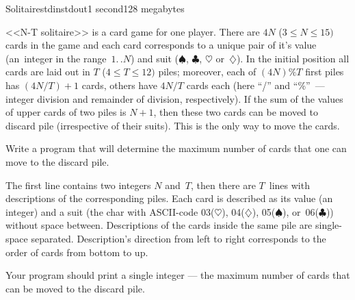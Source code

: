 \begin{problem}{Solitaire}{stdin}{stdout}{1 second}{128 megabytes}

<<N-T solitaire>> is a card game for one player. There are $4N$ 
($3\leq N\leq 15)$ cards in the game and each card corresponds to a unique pair of it's value (an~integer in the range~$1.\,.N$) and suit ($\spadesuit$, $\clubsuit$, $\heartsuit$ or~$\diamondsuit$). In the initial position all cards are laid out in $T$ ($4\leq T\leq 12)$ piles; moreover, each of $(4N)\%T$ first piles has $(4N/T)+1$ cards, others have $4N/T$ cards each (here ``/'' and ``\%''~--- integer division and remainder of division, respectively). If the sum of the values of upper cards of two piles is $N+1$, then these two cards can be moved to discard pile (irrespective of their suits). This is the only way to move the cards.

Write a program that will determine the maximum number of cards that one can move to the discard pile.

\InputFile
The first line contains two integers $N$ and~$T$, then there are $T$~lines with descriptions of the corresponding piles. Each card is described as its value (an integer) and a suit (the char with ASCII-code 03($\heartsuit$), 04($\diamondsuit$), 05($\spadesuit$), or~06($\clubsuit$)) without space between. Descriptions of the cards inside the same pile are single-space separated. Description's direction from left to right corresponds to the order of cards from bottom to up.

\OutputFile
Your program should print a single integer --- the maximum number of cards that can be moved to the discard pile.

\Examples

\begin{example}
%
\end{example}

\end{problem}

